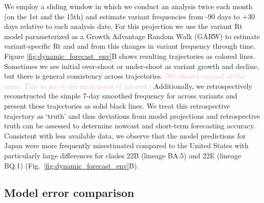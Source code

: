\documentclass[11pt,oneside,letterpaper]{article}
\def\mfc#1{\textcolor{pink}{[#1]}}
\begin{document}
We employ a sliding window in which we conduct an analysis twice each month (on the 1st and the 15th) and estimate variant frequencies from -90 days to +30 days relative to each analysis date.
For this projection we use the variant Rt model \cite{figgins2022sars} parameterized as a Growth Advantage Random Walk (GARW) to estimate variant-specific Rt and and from this changes in variant frequency through time.
Figure \ref{fig:dynamic_forecast_env}B shows resulting trajectories as colored lines.
Sometimes we see initial over-shoot or under-shoot as variant growth and decline, but there is general consistency across trajectories.
\mfc{We should expand of this more. This to me is the main point of interest.}
Additionally, we retrospectively reconstructed the simple 7-day smoothed frequency for across variants and present these trajectories as solid black lines.
We treat this retrospective trajectory as `truth' and thus deviations from model projections and retrospective truth can be assessed to determine nowcast and short-term forecasting accuracy.
Consistent with less available data, we observe that the model predictions for Japan were more frequently misestimated compared to the United States with particularly large differences for clades 22B (lineage BA.5) and 22E (lineage BQ.1) (Fig.~\ref{fig:dynamic_forecast_env}B).

\subsection*{Model error comparison}
\end{document}
